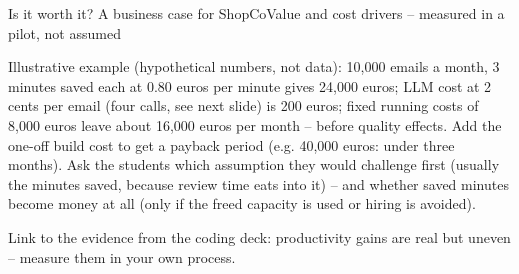 \documentclass[aspectratio=169,11pt]{beamer}
\begin{document}
\begin{frame}{Is it worth it? A business case for ShopCo}{Value and cost drivers -- measured in a pilot, not assumed}
{  Illustrative example (hypothetical numbers, not data): 10,000 emails a month, 3 minutes saved each at 0.80 euros per minute gives 24,000 euros; LLM cost at 2 cents per email (four calls, see next slide) is 200 euros; fixed running costs of 8,000 euros leave about 16,000 euros per month -- before quality effects. Add the one-off build cost to get a payback period (e.g. 40,000 euros: under three months). Ask the students which assumption they would challenge first (usually the minutes saved, because review time eats into it) -- and whether saved minutes become money at all (only if the freed capacity is used or hiring is avoided).\par
  Link to the evidence from the coding deck: productivity gains are real but uneven -- measure them in your own process.}
\end{frame}
\end{document}
